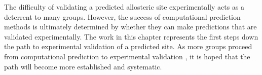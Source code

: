 The difficulty of validating a predicted allosteric site experimentally acts as a deterrent to many groups.
However, the success of computational prediction methods is ultimately determined by whether they can make predictions that are validated experimentally.
The work in this chapter represents the first steps down the path to experimental validation of a predicted site.
As more groups proceed from computational prediction to experimental validation \cite{Brecher2017}, it is hoped that the path will become more established and systematic.
